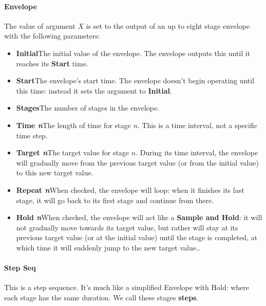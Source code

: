 \documentclass[twoside,10pt]{article}
\begin{document}
\paragraph{Envelope}

The value of argument \(X\) is set to the output of an up to eight stage envelope with the following parameters:

\begin{itemize}
\item {\bf Initial}\qquad The initial value of the envelope.   The envelope outputs this until it reaches its {\bf Start} time.
\item {\bf Start}\qquad The envelope's start time.  The envelope doesn't begin operating until this time: instead it sets the argument to {\bf Initial}.
\item {\bf Stages}\qquad The number of stages in the envelope.
\item {\bf Time \textit{n}}\qquad The length of time for stage \(n\).  This is a time interval, not a specific time step.
\item {\bf Target \textit{n}}\qquad The target value for stage \(n\).  During its time interval, the envelope will gradually move from the previous target value (or from the initial value) to this new target value.
\item {\bf Repeat \textit{n}}\qquad When checked, the envelope will loop: when it finishes its last stage, it will go back to its first stage and continue from there.
\item {\bf Hold \textit{n}}\qquad When checked, the envelope will act like a {\bf Sample and Hold}: it will not gradually move towards its target value, but rather will stay at its previous target value (or at the initial value) until the stage is completed, at which time it will suddenly jump to the new target value..
\end{itemize}

\paragraph{Step Seq}

This is a step sequence.  It's much like a simplified Envelope with Hold: where each stage has the same duration.   We call these stages {\bf steps}.
\end{document}
